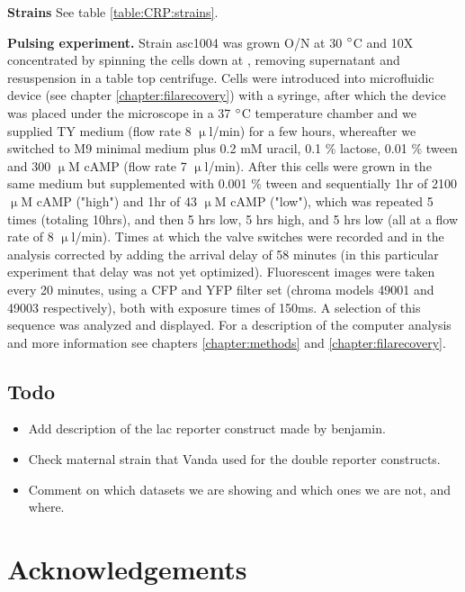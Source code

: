 \textbf{Strains} See table \ref{table:CRP:strains}.

\textbf{Pulsing experiment.} Strain asc1004 was grown O/N at 30 $\degree$C and 10X concentrated by spinning the cells down at , removing supernatant and resuspension in a table top centrifuge.
Cells were introduced into microfluidic device  (see chapter \ref{chapter:filarecovery}) with a syringe, after which the device was placed under the microscope in a 37 $\degree$C temperature chamber and we supplied TY medium (flow rate 8 $\upmu$l/min) for a few hours, whereafter we switched to M9 minimal medium plus 0.2 mM uracil, 0.1 $\%$ lactose, 0.01 $\%$ tween and 300 $\upmu$M cAMP (flow rate 7 $\upmu$l/min).
After this cells were grown in the same medium but supplemented with 0.001 $\%$ tween and sequentially 1hr of 2100 $\upmu$M cAMP ("high") and 1hr of 43 $\upmu$M cAMP ("low"), which was repeated 5 times (totaling 10hrs), and then 5 hrs low, 5 hrs high, and 5 hrs low (all at a flow rate of 8 $\upmu$l/min). 
Times at which the valve switches were recorded and in the analysis corrected by adding the arrival delay of 58 minutes (in this particular experiment that delay was not yet optimized).
Fluorescent images were taken every 20 minutes, using a CFP and YFP filter set (chroma models 49001 and 49003 respectively), both with exposure times of 150ms.
A selection of this sequence was analyzed and displayed.  
For a description of the computer analysis and more information see chapters \ref{chapter:methods} and \ref{chapter:filarecovery}.

\subsection*{Todo}

\begin{itemize}
	\item Add description of the lac reporter construct made by benjamin.
	\item Check maternal strain that Vanda used for the double reporter constructs.
	\item Comment on which datasets we are showing and which ones we are not, and where.
\end{itemize}


\section*{Acknowledgements}

